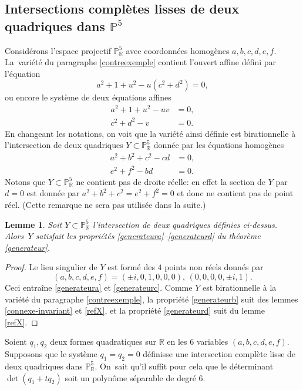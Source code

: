 \documentclass[11pt]{article}
\newtheorem{lemma}[thm]{Lemme}
\theoremstyle{definition}
\newcommand{\R}{\mathbb R}
\renewcommand{\P}{\mathbb P}
\newcommand{\on}[1]{\operatorname{#1}}
\begin{document}
\subsection{Intersections complètes lisses de deux quadriques dans \texorpdfstring{$\P^5$}{P5}}
Considérons l'espace projectif $\P^5_\R$ avec coordonnées homogènes $a,b,c,d,e,f$. La~variété du paragraphe \ref{contreexemple} contient l'ouvert affine défini par l'équation
\[a^2+1+u^2 - u (c^2+d^2)=0,\]
ou encore le système de deux équations affines
\begin{align*}
a^2+1+u^2 -uv &=0, \\
c^2+d^2-v&=0.
\end{align*}
En changeant les notations, on voit que
la variété ainsi définie est birationnelle
à l'intersection de
deux quadriques $Y\subset \P^5_{\R}$
donnée par les équations homogènes
\begin{align*}
a^2+ b^2+c^2 - cd&=0,\\
e^2+f^2-bd&= 0.
\end{align*}
Notons que $Y \subset \P^5_\R$ ne contient pas de droite réelle: en effet la section de $Y$ par $d=0$ est donnée par $a^2+ b^2+c^2=e^2+f^2=0$ et donc ne contient pas de point réel. (Cette remarque ne sera pas utilisée dans la suite.)

\begin{lemma}\label{speciale-int-quadriques}
Soit $Y\subset \P^5_\R$ l'intersection de deux quadriques définies ci-dessus. Alors~$Y$ satisfait les propriétés \eqref{generateura}--\eqref{generateurd} du théorème \ref{generateur}.
\end{lemma}

\begin{proof}
Le lieu singulier de $Y$ est formé des $4$ points non réels donnés par
\[
(a,b,c,d,e,f)= (\pm i, 0, 1,0,0,0),\, (0,0,0,0,\pm i, 1).
\]
Ceci entraîne \eqref{generateura} et \eqref{generateurc}. Comme $Y$ est birationnelle à la variété du paragraphe \ref{contreexemple}, la propriété \eqref{generateurb} suit des lemmes \ref{connexe-invariant} et \ref{refX}, et la propriété \eqref{generateurd} suit du lemme \ref{refX}.
\end{proof}

Soient $q_1, q_2$ deux formes quadratiques sur $\R$ en les 6 variables $(a,b,c,d,e,f)$. Supposons
que le système $q_1=q_2=0$ définisse une intersection complète lisse de deux quadriques dans $\P^5_{\R}$. On~sait qu'il suffit pour cela que le déterminant $\on{det}(q_1+tq_2)$ soit un polynôme séparable de degré $6$.
\end{document}
